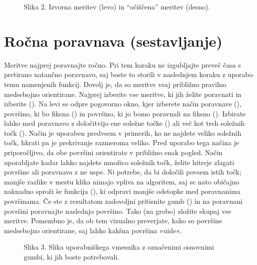 \documentclass[letterpaper,10pt,english]{sphinxmanual}
\begin{document}
\begin{figure}[htbp]
\centering
\capstart

\noindent{}
\caption{Slika 2. Izvorna meritev (levo) in “očiščena” meritev (desno).}\label{\detokenize{obdelava_3D_meritev:id3}}\end{figure}


\section{Ročna poravnava (sestavljanje)}
\label{\detokenize{obdelava_3D_meritev:rocna-poravnava-sestavljanje}}
\sphinxAtStartPar
Meritve najprej poravnajte ročno. Pri tem koraku ne izgubljajte preveč časa s pretirano natančno poravnavo, saj boste to storili v naslednjem koraku z uporabo temu namenjenih funkcij. Dovolj je, da so meritve vsaj približno pravilno medsebojno orientirane.
Najprej izberite vse meritve, ki jih želite poravnati in izberite  (). Na levi se odpre pogovorno okno, kjer izberete način poravnave (), površino, ki bo fiksna () in površino, ki jo bomo poravnali na fiksno (). Izbirate lahko med poravnavo z določitvijo ene soležne točke () ali več kot treh soležnih točk (). Način  je uporaben predvsem v primerih, ko ne najdete veliko soležnih točk, hkrati pa je prekrivanje razmeroma veliko. Pred uporabo tega načina je priporočljivo, da obe površini orientirate v približno enak pogled. Način  uporabljate kadar lahko najdete množico soležnih točk, želite hitreje zlagati površine ali poravnava z  ne uspe. Ni potrebe, da bi določili  povsem istih točk; manjše razlike v mestu klika nimajo vpliva na algoritem, saj se nato običajno naknadno sproži še funkcija  (), ki odpravi manjše odstopke med poravnanima površinama. Če ste z rezultatom zadovoljni pritisnite gumb  () in na poravnani površini poravnajte naslednjo površino. Tako (na grobo) zložite skupaj vse meritve. Pomembno je, da ob tem vizualno preverjate, kako so površine medsebojno orientirane, saj lahko kakšna površina »uide«.

\begin{figure}[htbp]
\centering
\capstart

\noindent{}
\caption{Slika 3. Slika uporabniškega vmesnika z označenimi osnovnimi gumbi, ki jih boste potrebovali.}\label{\detokenize{obdelava_3D_meritev:id4}}\end{figure}
\end{document}
